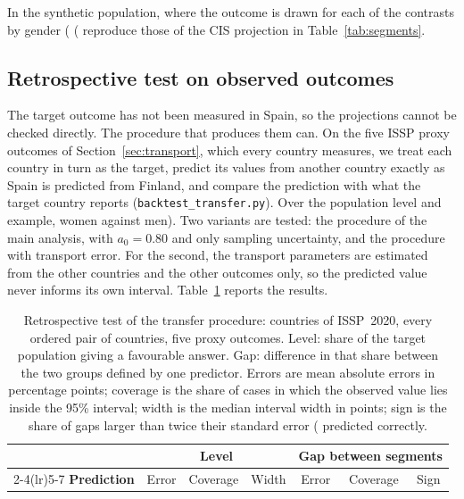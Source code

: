 In the synthetic population, where the outcome is drawn for each of the
contrasts by gender (%
(%
reproduce those of the CIS projection in Table~\ref{tab:segments}.

\subsection{Retrospective test on observed outcomes}
\label{sec:backtest}

The target outcome has not been measured in Spain, so the projections cannot
be checked directly. The procedure that produces them can. On the five ISSP
proxy outcomes of Section~\ref{sec:transport}, which every country measures, we
treat each country in turn as the target, predict its values from another
country exactly as Spain is predicted from Finland, and compare the prediction
with what the target country reports (\texttt{backtest\_transfer.py}). Over the
population level and %
example, women against men). Two variants are tested: the procedure of the main
analysis, with $a_0 = 0.80$ and only sampling uncertainty, and the procedure
with transport error. For the second, the transport parameters are estimated
from the other countries and the other outcomes only, so the predicted value
never informs its own interval. Table~\ref{tab:backtest} reports the results.

\begin{table}[htbp]
\centering
\caption{Retrospective test of the transfer procedure: %
countries of ISSP~2020, every ordered pair of countries, five proxy outcomes.
Level: share of the target population giving a favourable answer. Gap:
difference in that share between the two groups defined by one predictor.
Errors are mean absolute errors in percentage points; coverage is the share of
cases in which the observed value lies inside the 95\% interval; width is the
median interval width in points; sign is the share of gaps larger than twice
their standard error (%
predicted correctly.}
\label{tab:backtest}
\small
\begin{tabular}{lcccccc}
\toprule
 & \multicolumn{3}{c}{\textbf{Level}} & \multicolumn{3}{c}{\textbf{Gap between segments}} \\
\cmidrule(lr){2-4}\cmidrule(lr){5-7}
\textbf{Prediction} & Error & Coverage & Width & Error & Coverage & Sign \\
\midrule
\bottomrule
\end{tabular}
\end{table}

